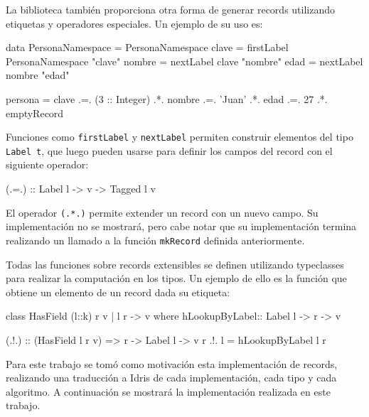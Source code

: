 La biblioteca también proporciona otra forma de generar records utilizando etiquetas y operadores especiales. Un ejemplo de su uso es:

\begin{code}
data PersonaNamespace = PersonaNamespace 
clave = firstLabel PersonaNamespace "clave"
nombre = nextLabel clave "nombre"
edad = nextLabel nombre "edad"

persona = clave .=. (3 :: Integer)
  .*. nombre .=. 'Juan'
  .*. edad .=. 27
  .*. emptyRecord
\end{code}

Funciones como \texttt{firstLabel} y \texttt{nextLabel} permiten construir elementos del tipo \texttt{Label t}, que luego pueden usarse para definir los campos del record con el siguiente operador:

\begin{code}
(.=.) :: Label l -> v -> Tagged l v
\end{code}

El operador \texttt{(.*.)} permite extender un record con un nuevo campo. Su implementación no se mostrará, pero cabe notar que su implementación termina realizando un llamado a la función \texttt{mkRecord} definida anteriormente.

Todas las funciones sobre records extensibles se definen utilizando typeclasses para realizar la computación en los tipos.
Un ejemplo de ello es la función que obtiene un elemento de un record dada su etiqueta:

\begin{code}
class HasField (l::k) r v | l r -> v where
  hLookupByLabel:: Label l -> r -> v

(.!.) :: (HasField l r v) => r -> Label l -> v
r .!. l =  hLookupByLabel l r
\end{code}

Para este trabajo se tomó como motivación esta implementación de records, realizando una traducción a Idris de cada implementación, cada tipo y cada algoritmo. A continuación se mostrará la implementación realizada en este trabajo.

